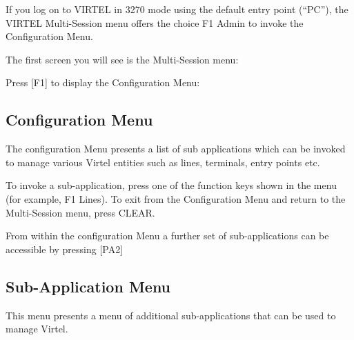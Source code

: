 \documentclass[letterpaper,10pt,english]{sphinxmanual}
\begin{document}
If you log on to VIRTEL in 3270 mode using the default entry point (“PC”), the VIRTEL Multi-Session menu offers the choice F1 \textendash{} Admin to invoke the Configuration Menu.

The first screen you will see is the Multi-Session menu:


Press {[}F1{]} to display the Configuration Menu:

\newpage

\ignorespaces 

\subsection{Configuration Menu}
\label{\detokenize{connectivity_guide:configuration-menu}}\label{\detokenize{connectivity_guide:index-1}}
The configuration Menu presents a list of sub applications which can be invoked to manage various Virtel entities such as lines, terminals, entry points etc.


To invoke a sub-application, press one of the function keys shown in the menu (for example, F1 \textendash{} Lines). To exit from the Configuration Menu and return to the Multi-Session menu, press CLEAR.

From within the configuration Menu a further set of sub-applications can be accessible by pressing {[}PA2{]}

\newpage

\ignorespaces 

\subsection{Sub-Application Menu}
\label{\detokenize{connectivity_guide:sub-application-menu}}\label{\detokenize{connectivity_guide:index-2}}
This menu presents a menu of additional sub-applications that can be used to manage Virtel.
\end{document}
